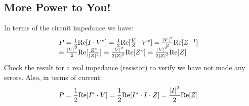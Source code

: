 \subsection{More Power to You!}
In terms of the circuit impedance we have:
    \begin{equation}
        \begin{array}{l}
            P = \frac{1}{2}{\mathop{\rm Re}\nolimits} [I \cdot {V^*}] = \frac{1}{2}{\mathop{\rm Re}\nolimits} [\frac{V}{Z} \cdot {V^*}] = \frac{{{{\left| V \right|}^2}}}{2}{\mathop{\rm Re}\nolimits} [{Z^{ - 1}}]\\
            = \frac{{{{\left| V \right|}^2}}}{2}{\mathop{\rm Re}\nolimits} [\frac{{{Z^*}}}{{{{\left| Z \right|}^2}}}] = \frac{{{{\left| V \right|}^2}}}{{2{{\left| Z \right|}^2}}}{\mathop{\rm Re}\nolimits} [{Z^*}] = \frac{{{{\left| V \right|}^2}}}{{2{{\left| Z \right|}^2}}}{\mathop{\rm Re}\nolimits} [Z]
        \end{array}
    \end{equation}
Check the result for a real impedance (resistor) to verify we have not made any errors.   Also, in terms of current:
    \begin{equation}
        P = \frac{1}{2}{\mathop{\rm Re}\nolimits} [{I^*} \cdot V] = \frac{1}{2}{\mathop{\rm Re}\nolimits} [{I^*} \cdot I \cdot Z] = \frac{{{{\left| I \right|}^2}}}{2}{\mathop{\rm Re}\nolimits} [Z]
    \end{equation}
